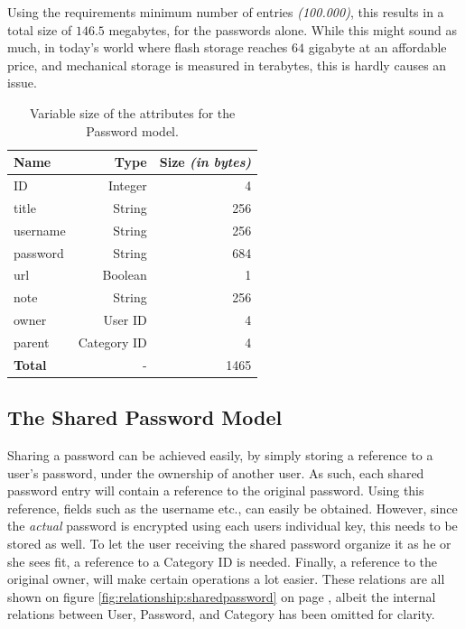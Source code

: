 				Using the requirements minimum number of entries \emph{(100.000)}, this results in a total size of $146.5$ megabytes, for the passwords alone. While this might sound as much, in today's world where flash storage reaches $64$ gigabyte at an affordable price, and mechanical storage is measured in terabytes, this is hardly causes an issue.

				\begin{table}
					\centering
					\begin{tabular}{l | r | r}
						\textbf{Name}  			& \textbf{Type} 		& \textbf{Size \emph{(in bytes)}} 		\\
						\hline
						ID 						& Integer 			& 4						\\
						title 					& String 			& 256					\\
						username 				& String 			& 256					\\
						password 				& String 			& 684					\\
						url						& Boolean 			& 1						\\
						note  					& String 			& 256					\\
						owner 					& User ID 			& 4						\\
						parent 					& Category ID 		& 4						\\
						\hline\hline
						\textbf{Total} 			& - 				& 1465
					\end{tabular}
					\caption{Variable size of the attributes for the Password model.}
					\label{tab:model:password:size}
				\end{table}


		\subsection{The Shared Password Model}
			Sharing a password can be achieved easily, by simply storing a reference to a user's password, under the ownership of another user. As such, each shared password entry will contain a reference to the original password. Using this reference, fields such as the username etc., can easily be obtained. However, since the \emph{actual} password is encrypted using each users individual key, this needs to be stored as well. To let the user receiving the shared password organize it as he or she sees fit, a reference to a Category ID is needed. Finally, a reference to the original owner, will make certain operations a lot easier. These relations are all shown on figure \ref{fig:relationship:sharedpassword} on page \pageref{fig:relationship:sharedpassword}, albeit the internal relations between User, Password, and Category has been omitted for clarity.

